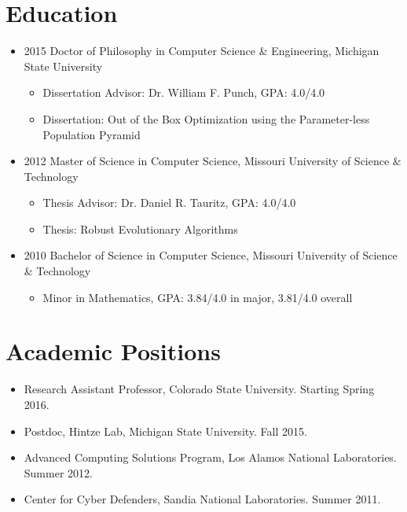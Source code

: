 \documentclass[a4paper,11pt]{article}
\begin{document}
\maketitle
 
\section{Education}
\begin{itemize}
\item 2015 Doctor of Philosophy in Computer Science \& Engineering, Michigan State University
\begin{itemize}
  \item Dissertation Advisor:  Dr. William F. Punch, GPA: 4.0/4.0
  \item Dissertation: Out of the Box Optimization using the Parameter-less Population Pyramid
\end{itemize}
\item 2012 Master of Science in Computer Science, Missouri University of Science \& Technology
\begin{itemize}
  \item Thesis Advisor:  Dr. Daniel R. Tauritz, GPA: 4.0/4.0
  \item Thesis: Robust Evolutionary Algorithms
\end{itemize}
\item 2010 Bachelor of Science in Computer Science, Missouri University of Science \& Technology
\begin{itemize}
  \item Minor in Mathematics, GPA: 3.84/4.0 in major, 3.81/4.0 overall
\end{itemize}
\end{itemize}
\section{Academic Positions}
\begin{itemize}
\item Research Assistant Professor, Colorado State University. Starting Spring 2016.
\item Postdoc, Hintze Lab, Michigan State University. Fall 2015.
\item Advanced Computing Solutions Program, Los Alamos National Laboratories. Summer 2012.
\item Center for Cyber Defenders, Sandia National Laboratories. Summer 2011.
\end{itemize}
\end{document}
